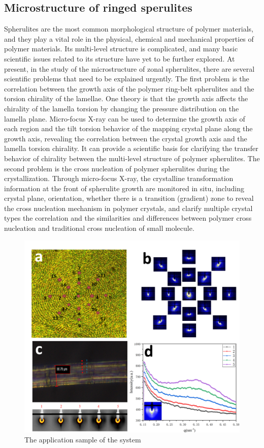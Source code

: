 \documentclass{Head}
\begin{document}
\subsection{Microstructure of ringed sperulites}
Spherulites are the most common morphological structure of polymer materials, and they play a vital role in the physical, chemical and mechanical properties of polymer materials. Its multi-level structure is complicated, and many basic scientific issues related to its structure have yet to be further explored.
At present, in the study of the microstructure of zonal spherulites, there are several scientific problems that need to be explained urgently. The first problem is the correlation between the growth axis of the polymer ring-belt spherulites and the torsion chirality of the lamellae.
One theory is that the growth axis affects the chirality of the lamella torsion by changing the pressure distribution on the lamella plane.
Micro-focus X-ray can be used to determine the growth axis of each region and the tilt torsion behavior of the mapping crystal plane along the growth axis, revealing the correlation between the crystal growth axis and the lamella torsion chirality. It can provide a scientific basis for clarifying the transfer behavior of chirality between the multi-level structure of polymer spherulites.
The second problem is the cross nucleation of polymer spherulites during the crystallization.
Through micro-focus X-ray, the crystalline transformation information at the front of spherulite growth are monitored in situ, including crystal plane, orientation, whether there is a transition (gradient) zone to reveal the cross nucleation mechanism in polymer crystals, and clarify multiple crystal types the correlation and the similarities and differences between polymer cross nucleation and traditional cross nucleation of small molecule.
\begin{figure}
    \centering
    \includegraphics[scale=0.4]{Figures/Fig7AppliedResearch.png}
    \caption{The application sample of the system}
    \label{apply}
\end{figure}
\end{document}
